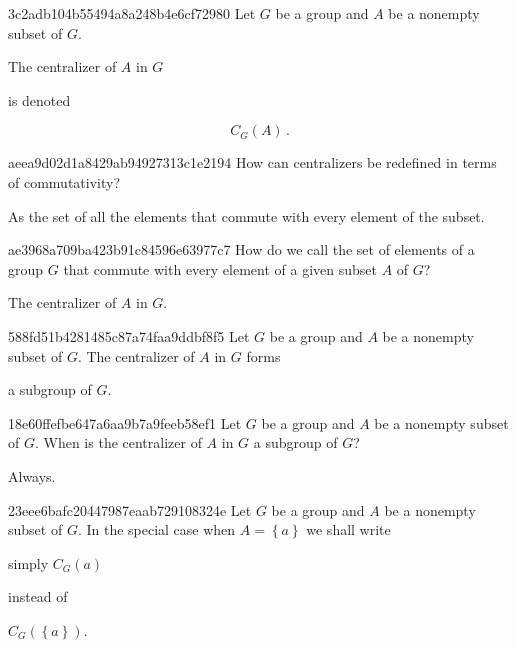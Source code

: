 \begin{note}{3c2adb104b55494a8a248b4e6cf72980}
    Let \({ G }\) be a group and \({ A }\) be a nonempty subset of \({ G }\).
    \begin{icloze}{2}The centralizer of \({ A }\) in \({ G }\)\end{icloze} is denoted
    \begin{icloze}{1}
        \[
            C_G(A)\,.
        \]
    \end{icloze}
\end{note}

\begin{note}{aeea9d02d1a8429ab94927313c1e2194}
    How can centralizers be redefined in terms of commutativity?

    \begin{cloze}{1}
        As the set of all the elements that commute with every element of the subset.
    \end{cloze}
\end{note}

\begin{note}{ae3968a709ba423b91c84596e63977c7}
    How do we call the set of elements of a group \({ G }\) that commute with every element of a given subset \({ A }\) of \({ G }\)?

    \begin{cloze}{1}
        The centralizer of \({ A }\) in \({ G }\).
    \end{cloze}
\end{note}

\begin{note}{588fd51b4281485c87a74faa9ddbf8f5}
    Let \({ G }\) be a group and \({ A }\) be a nonempty subset of \({ G }\).
    The centralizer of \({ A }\) in \({ G }\) forms \begin{icloze}{1}a subgroup of \({ G }\).\end{icloze}
\end{note}

\begin{note}{18e60ffefbe647a6aa9b7a9feeb58ef1}
    Let \({ G }\) be a group and \({ A }\) be a nonempty subset of \({ G }\).
    When is the centralizer of \({ A }\) in \({ G }\) a subgroup of \({ G }\)?

    \begin{cloze}{1}
        Always.
    \end{cloze}
\end{note}

\begin{note}{23eee6bafc20447987eaab729108324e}
    Let \({ G }\) be a group and \({ A }\) be a nonempty subset of \({ G }\).
    In the special case when \({ A = \left\{ a \right\} }\) we shall write \begin{icloze}{1}simply \({ C_{G}(a) }\)\end{icloze} instead of \begin{icloze}{2}\({ C_{G}(\left\{ a \right\}) }\).\end{icloze}
\end{note}

